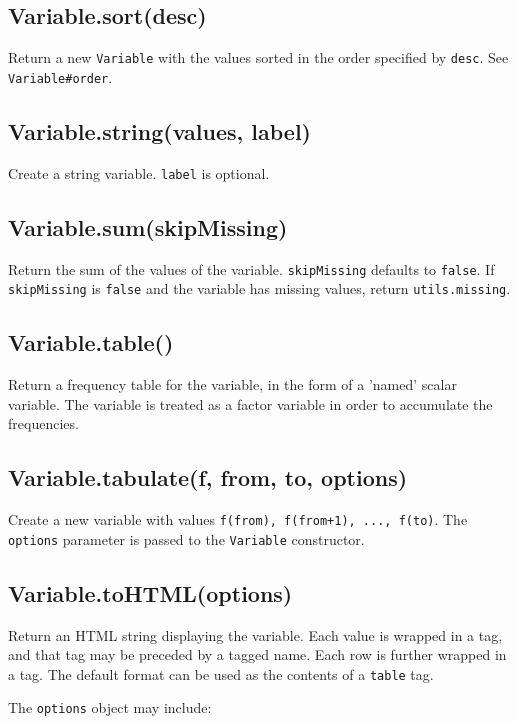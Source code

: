 \documentclass{article}
\begin{document}
    \subsection{Variable.sort(desc)}
    Return a new \texttt{Variable} with the values sorted in the order specified by \texttt{desc}.
See \texttt{Variable\#order}.


    \subsection{Variable.string(values, label)}
    Create a string variable. \texttt{label} is optional.


    \subsection{Variable.sum(skipMissing)}
    Return the sum of the values of the variable.
\texttt{skipMissing} defaults to \texttt{false}.  If \texttt{skipMissing} is \texttt{false} and
the variable has missing values, return \texttt{utils.missing}.


    \subsection{Variable.table()}
    Return a frequency table for the variable, in the form of a 'named' scalar
variable.  The variable is treated as a factor variable in order to
accumulate the frequencies.


    \subsection{Variable.tabulate(f, from, to, options)}
    Create a new variable with values \texttt{f(from), f(from+1), ..., f(to)}.
The \texttt{options} parameter is passed to the \texttt{Variable} constructor.


    \subsection{Variable.toHTML(options)}
    Return an HTML string displaying the variable. Each value is wrapped in
a tag, and that tag may be preceded by a tagged name. Each row is further
wrapped in a tag. The default format can be used as the contents of a
\texttt{table} tag.


The \texttt{options} object may include:
\end{document}
